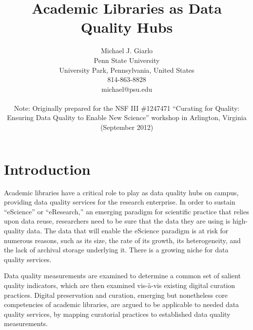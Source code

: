 \documentclass[12pt,letterpaper,titlepage,onecolumn,biblatex,backend=biber,style=chicago-authordate]{article}
\title{Academic Libraries as Data Quality Hubs}
\author{%
  Michael J. Giarlo \\
  Penn State University \\
  University Park, Pennsylvania, United States \\
  814-863-8828 \\
  michael@psu.edu \\
  \\
  Note: Originally prepared for the NSF III \#1247471 ``Curating for
  Quality: Ensuring Data Quality to Enable New Science'' workshop in
  Arlington, Virginia (September 2012)}
\begin{document}
%

\section{Introduction}
Academic libraries have a critical role to play as data quality hubs
on campus, providing data quality services for the research
enterprise. In order to sustain ``eScience'' or ``eResearch,'' an
emerging paradigm for scientific practice that relies upon data reuse,
researchers need to be sure that the data they are using is
high-quality data. The data that will enable the eScience paradigm is
at risk for numerous reasons, such as its size, the rate of its
growth, its heterogeneity, and the lack of archival storage underlying
it. There is a growing niche for data quality services.

Data quality measurements are examined to determine a common set of
salient quality indicators, which are then examined vis-\`{a}-vis
existing digital curation practices. Digital preservation and
curation, emerging but nonetheless core competencies of academic
libraries, are argued to be applicable to needed data quality
services, by mapping curatorial practices to established data quality
measurements.
\end{document}

